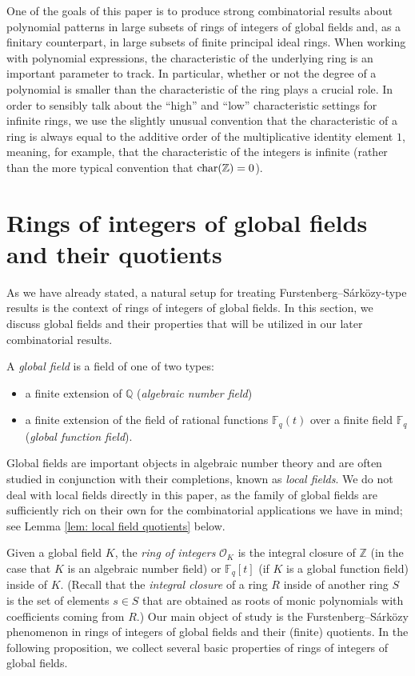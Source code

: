 \documentclass{amsart}
\theoremstyle{definition}
\numberwithin{equation}{section}
\newcommand{\Z}{\mathbb{Z}}
\newcommand{\Q}{\mathbb{Q}}
\newcommand{\F}{\mathbb{F}}
\newcommand{\mO}{\mathcal{O}}
\renewcommand{\char}{\textup{char}}
\begin{document}
One of the goals of this paper is to produce strong combinatorial results about polynomial patterns in large subsets of rings of integers of global fields and, as a finitary counterpart, in large subsets of finite principal ideal rings.
When working with polynomial expressions, the characteristic of the underlying ring is an important parameter to track.
In particular, whether or not the degree of a polynomial is smaller than the characteristic of the ring plays a crucial role.
In order to sensibly talk about the ``high'' and ``low'' characteristic settings for infinite rings, we use the slightly unusual convention that the characteristic of a ring is always equal to the additive order of the multiplicative identity element $1$, meaning, for example, that the characteristic of the integers is infinite (rather than the more typical convention that $\char(\Z) = 0$).


\section{Rings of integers of global fields and their quotients} \label{sec:setting}

As we have already stated, a natural setup for treating Furstenberg--S\'{a}rk\"{o}zy-type results is the context of rings of integers of global fields.
In this section, we discuss global fields and their properties that will be utilized in our later combinatorial results.

A \emph{global field} is a field of one of two types:

\begin{itemize}
	\item	a finite extension of $\Q$ (\emph{algebraic number field})
	\item	a finite extension of the field of rational functions $\F_q(t)$ over a finite field $\F_q$ (\emph{global function field}).
\end{itemize}

Global fields are important objects in algebraic number theory and are often studied in conjunction with their completions, known as \emph{local fields}.
We do not deal with local fields directly in this paper, as the family of global fields are sufficiently rich on their own for the combinatorial applications we have in mind; see Lemma \ref{lem: local field quotients} below.

Given a global field $K$, the \emph{ring of integers} $\mO_K$ is the integral closure of $\Z$ (in the case that $K$ is an algebraic number field) or $\F_q[t]$ (if $K$ is a global function field) inside of $K$.
(Recall that the \emph{integral closure} of a ring $R$ inside of another ring $S$ is the set of elements $s \in S$ that are obtained as roots of monic polynomials with coefficients coming from $R$.)
Our main object of study is the Furstenberg--S\'{a}rk\"{o}zy phenomenon in rings of integers of global fields and their (finite) quotients.
In the following proposition, we collect several basic properties of rings of integers of global fields.
\end{document}
